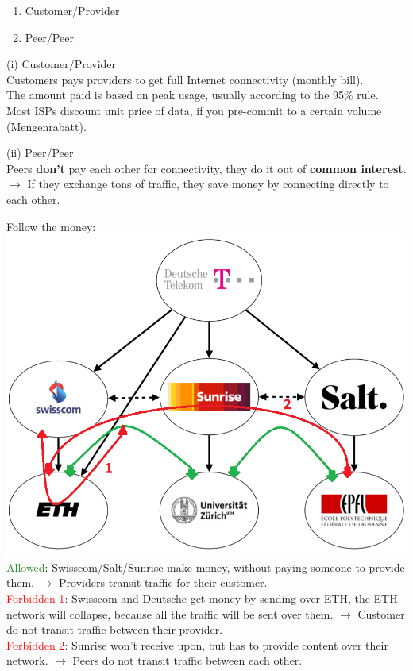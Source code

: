 \documentclass[a4paper, fontsize=8pt, landscape, DIV=1]{scrartcl}
\begin{document}
\begin{multicols*}{4}
	 	\begin{enumerate}[label=(\roman*),noitemsep]
	 		\item Customer/Provider
	 		\item Peer/Peer
	 	\end{enumerate}
	 	(i) Customer/Provider\\
	 	Customers pays providers to get full Internet connectivity (monthly bill).\\
	 	The amount paid is based on peak usage, usually according to the 95\% rule.\\
	 	Most ISPs discount unit price of data, if you pre-commit to a certain volume (Mengenrabatt).\par 
	 	
	 	(ii) Peer/Peer\\
	 	Peers \textbf{don't} pay each other for connectivity, they do it out of \textbf{common interest}. $\rightarrow$ If they exchange tons of traffic, they save money by connecting directly to each other.\par 
	 	
	 	Follow the money:\\ 
	 	\includegraphics[width=\columnwidth]{images/Network_Layer/follow_the_money.png}
	 	\textcolor{ForestGreen}{Allowed}: Swisscom/Salt/Sunrise make money, without paying someone to provide them. $\rightarrow$ Providers transit traffic for their customer.\\ 
	 	\textcolor{Red}{Forbidden 1}: Swisscom and Deutsche get money by sending over ETH, the ETH network will collapse, because all the traffic will be sent over them. $\rightarrow$ Customer do not transit traffic between their provider.\\
	 	\textcolor{Red}{Forbidden 2}: Sunrise won't receive upon, but has to provide content over their network. $\rightarrow$ Peers do not transit traffic between each other.\par 
	 	

\end{multicols*}
\end{document}
